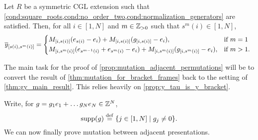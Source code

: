 \begin{theorem}\label{thm:mutation_for_bracket_frames}
	Let $R$ be a symmetric CGL extension such that \cref{cond:square_roots,cond:no_order_two,cond:normalization_generators} are satisfied. Then, for all $i \in [1, N]$ and $m \in \mathbb{Z}_{> 0}$ such that $s^m(i) \in [1, N]$,
	\begin{equation*}
		\oy_{[s(i), s^m(i)]} = \begin{dcases*}
			M_{[i, s(i)]}(e_{s(i)} - e_i) + M_{[i, s(i)]}(g_{[i, s(i)]} - e_i),                         & if $m=1$    \\
			M_{[i, s^m(i)]}(e_{s^{m-1}(i)} + e_{s^m(i)} -e_i) + M_{[i, s^m(i)]}(g_{[i, s^m(i)]} - e_i), & if $m > 1$.
		\end{dcases*}
	\end{equation*}
\end{theorem}

The main task for the proof of \cref{prop:mutation_adjacent_permutations} will be to
convert the result of \cref{thm:mutation_for_bracket_frames} back to the setting of
\cref{thm:gy_main_result}. This relies heavily on \cref{prop:y_tau_is_y_bracket}.

Write, for $g = g_1e_1 + \dots g_N e_N \in \mathbb{Z}^N$,
\begin{equation*}
	\operatorname{supp}(g) \overset{\mathrm{def}}{=} \{j \in [1, N] \mid g_j \neq 0\}.
\end{equation*}
%
We can now finally prove mutation between adjacent presentations.

